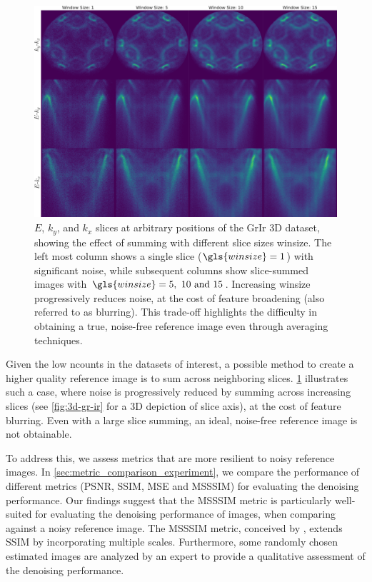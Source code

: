 
\begin{figure}
    \centering
    \includegraphics[width=0.8\linewidth]{images/slices.pdf}
    \caption{$E$, $k_y$, and $k_x$ slices at arbitrary positions of the \gls{GrIr} 3D dataset, showing the effect of summing with different  slice sizes \gls{winsize}. The left most column shows a single slice ($\gls{winsize}=1$) with significant noise, while subsequent columns show slice-summed images with $\gls{winsize}=\numlist{5;10;15}$. Increasing \gls{winsize} progressively reduces noise, at the cost of feature broadening (also referred to as blurring). This trade-off highlights the difficulty in obtaining a true, noise-free reference image even through averaging techniques.}
    \label{fig:slices}
\end{figure}


Given the low \gls{ncounts} in the datasets of interest, a possible method to create a higher quality reference image is to sum across neighboring slices. \cref{fig:slices} illustrates such a case, where noise is progressively reduced by summing across increasing slices (see \cref{fig:3d-gr-ir} for a 3D depiction of slice axis), at the cost of feature blurring. Even with a large slice summing, an ideal, noise-free reference image is not obtainable.

To address this, we assess metrics that are more resilient to noisy reference images. In \cref{sec:metric_comparison_experiment}, we compare the performance of different metrics (\gls{PSNR}, \gls{SSIM}, \gls{MSE} and \gls{MSSSIM}) for evaluating the denoising performance. Our findings suggest that the \gls{MSSSIM} metric is particularly well-suited for evaluating the denoising performance of images, when comparing against a noisy reference image. The \gls{MSSSIM} metric, conceived by \citeauthor{wangMultiscaleStructuralSimilarity2003} \cite{wangMultiscaleStructuralSimilarity2003}, extends SSIM by incorporating multiple scales. Furthermore, some randomly chosen estimated images are analyzed by an expert to provide a qualitative assessment of the denoising performance.

